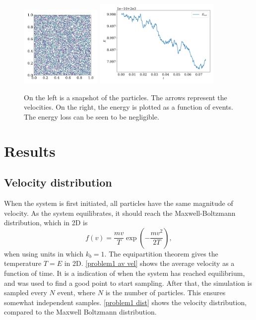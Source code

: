 \documentclass{article}
\begin{document}
    \begin{figure}[H]
        \centering
        \includegraphics[width=0.35\textwidth]{../plots/test_case_many_particles/test_case_many_particles.pdf}
        \includegraphics[width=0.54\textwidth]{../plots/test_case_many_particles/energy.pdf}
        \caption{On the left is a snapshot of the particles.
        The arrows represent the velocities.
        On the right, the energy is plotted as a function of events.
        The energy loss can be seen to be negligible.}
        \label{test many particles}
    \end{figure}

    \section*{Results}
    \subsection*{Velocity distribution}

    When the system is first initiated, all particles have the same magnitude of velocity.
    As the system equilibrates, it should reach the Maxwell-Boltzmann distribution, which in 2D is
    \begin{equation*}
        f(v) = \frac{m v}{T} \exp \left(-\frac{m v^2}{2 T}\right),
    \end{equation*}
    when using units in which $k_b = 1$.
    The equipartition theorem gives the temperature $T = E$ in 2D.
    \autoref{problem1 av vel} shows the average velocity as a function of time.
    It is a indication of when the system has reached equilibrium, and was used to find a good point to start sampling.
    After that, the simulation is sampled every $N$ event, where $N$ is the number of particles.
    This ensures somewhat independent samples.
    \autoref{problem1 dist} shows the velocity distribution, compared to the Maxwell Boltzmann distribution.
\end{document}
